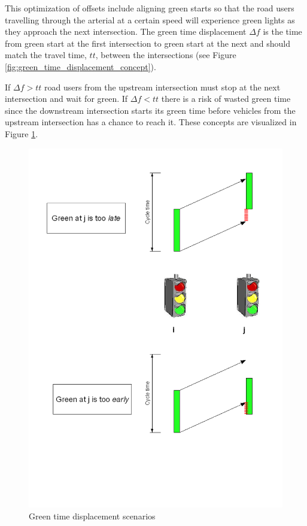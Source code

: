 This optimization of offsets include aligning green starts so that the road users travelling through the arterial at a certain speed will experience green lights as they approach the next intersection. The green time displacement $\Delta f$ is the time from green start at the first intersection to green start at the next and should match the travel time, $tt$, between the intersections (see Figure \ref{fig:green_time_displacement_concept}). 

If $\Delta f > tt$ road users from the upstream intersection must stop at the next intersection and wait for green. If $\Delta f < tt$ there is a risk of wasted green time since the downstream intersection starts its green time before vehicles from the upstream intersection has a chance to reach it. These concepts are visualized in Figure \ref{fig:green_time_displacement}.

\begin{figure}[htb]
\centering
\includegraphics[scale=0.5]{green_time_displacement.png} 
\caption{Green time displacement scenarios}
\label{fig:green_time_displacement}
\end{figure}

